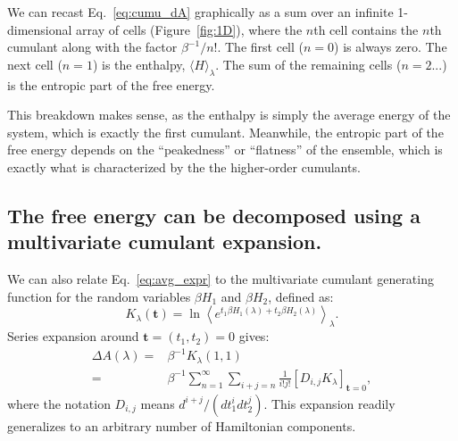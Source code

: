 \documentclass{article}
\let\vec\mathbf
\begin{document}
We can recast Eq.~\ref{eq:cumu_dA} graphically as a sum over an infinite 1-dimensional array of cells (Figure~\ref{fig:1D}), where the $n$th cell contains the $n$th cumulant along with the factor $\beta^{-1}/n!$. The first cell ($n=0$) is always zero. The next cell ($n=1$) is the enthalpy, $\langle H \rangle_\lambda$. The sum of the remaining cells ($n=2...$) is the entropic part of the free energy.

This breakdown makes sense, as the enthalpy is simply the average energy of the system, which is exactly the first cumulant. Meanwhile, the entropic part of the free energy depends on the ``peakedness'' or ``flatness'' of the ensemble, which is exactly what is characterized by the the higher-order cumulants.


\subsection{The free energy can be decomposed using a multivariate cumulant expansion.}

We can also relate Eq.~\ref{eq:avg_expr} to the multivariate cumulant generating function for the random variables $\beta H_1$ and $\beta H_2$, defined as:
\begin{equation}
K_\lambda(\vec t) =
	\ln \left\langle 
    	e^{t_1 \beta H_1(\lambda) + t_2 \beta H_2(\lambda)}
    \right\rangle_\lambda.
\end{equation}
Series expansion around $\vec t = (t_1, t_2) = 0$ gives:
\begin{align}
\Delta A(\lambda) =& \beta^{-1} K_\lambda(1, 1) \nonumber\\
                  =& \beta^{-1} \sum_{n=1}^{\infty}
	        			\sum_{i+j=n}
            			\frac{1}{i!j!}\left[ D_{i,j} K_\lambda\right]_{\vec t=0},
\label{eq:mult_expansion}
\end{align}
where the notation $D_{i,j}$ means $d^{i+j} /(d t_1^i d t_2^j)$. This expansion readily generalizes to an arbitrary number of Hamiltonian components. 
\end{document}
